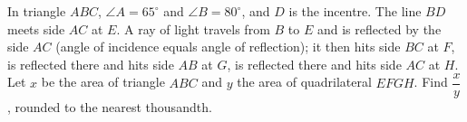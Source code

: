 In triangle $ABC$, $\angle A=65^\circ$ and $\angle B=80^\circ$, and $D$ is the incentre. The line $BD$ meets side $AC$ at $E$. A ray of light travels from $B$ to $E$ and is reflected by the side $AC$ (angle of incidence equals angle of reflection); it then hits side $BC$ at $F$, is reflected there and hits side $AB$ at $G$, is reflected there and hits side $AC$ at $H$. Let $x$ be the area of triangle $ABC$ and $y$ the area of quadrilateral $EFGH$. Find $\dfrac xy$, rounded to the nearest thousandth.
